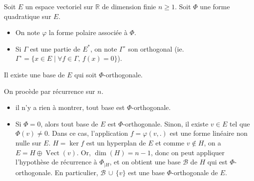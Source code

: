 




	Soit $E$ un espace vectoriel sur $\mathbb{R}$ de dimension finie $n \geq 1$. Soit $\Phi$ une forme quadratique sur $E$.

	\medskip

	\begin{notation}
		\begin{itemize}
			\item On note $\varphi$ la forme polaire associée à $\Phi$.
			\item Si $\Gamma$ est une partie de $E^*$, on note $\Gamma^\circ$ son orthogonal (ie. $\Gamma^\circ = \{ x \in E \mid \forall f \in \Gamma, \, f(x) = 0 \}$).
		\end{itemize}
	\end{notation}


	\begin{lemma}
		\label{loi-d-inertie-de-sylvester-1}
		Il existe une base de $E$ qui soit $\Phi$-orthogonale.
	\end{lemma}

	\begin{demonstration}
		On procède par récurrence sur $n$.
		\begin{itemize}
			\item {} il n'y a rien à montrer, tout base est $\Phi$-orthogonale.
			\item {} Si $\Phi = 0$, alors tout base de $E$ est $\Phi$-orthogonale. Sinon, il existe $v \in E$ tel que $\Phi(v) \neq 0$. Dans ce cas, l'application $f = \varphi(v, .)$ est une forme linéaire non nulle sur $E$.
			\newpar
			$H = \ker{f}$ est un hyperplan de $E$ et comme $v \notin H$, on a $E = H \oplus \operatorname{Vect}(v)$. Or, $\dim(H) = n-1$, donc on peut appliquer l'hypothèse de récurrence à $\Phi_{|H}$, et on obtient une base $\mathcal{B}$ de $H$ qui est $\Phi$-orthogonale. En particulier, $\mathcal{B} \, \cup \, \{ v \}$ est une base $\Phi$-orthogonale de $E$.
		\end{itemize}
	\end{demonstration}

